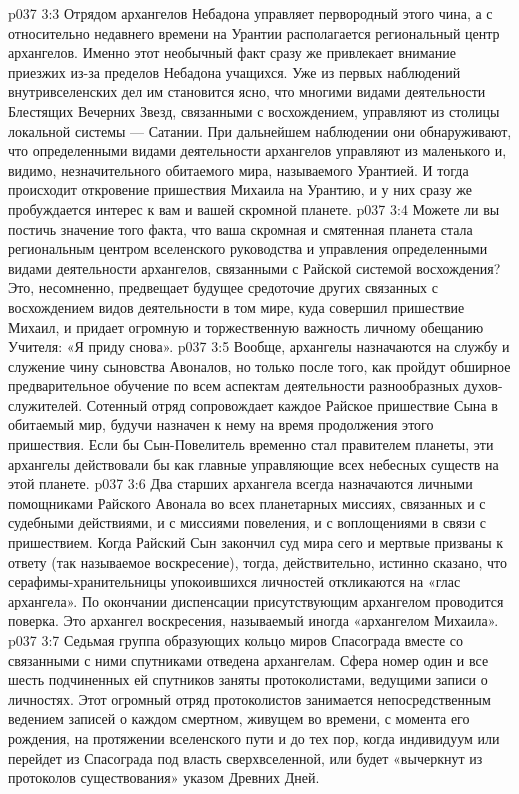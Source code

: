 \vs p037 3:3 \pc Отрядом архангелов Небадона управляет первородный этого чина, а с относительно недавнего времени на Урантии располагается региональный центр архангелов. Именно этот необычный факт сразу же привлекает внимание приезжих из\hyp{}за пределов Небадона учащихся. Уже из первых наблюдений внутривселенских дел им становится ясно, что многими видами деятельности Блестящих Вечерних Звезд, связанными с восхождением, управляют из столицы локальной системы --- Сатании. При дальнейшем наблюдении они обнаруживают, что определенными видами деятельности архангелов управляют из маленького и, видимо, незначительного обитаемого мира, называемого Урантией. И тогда происходит откровение пришествия Михаила на Урантию, и у них сразу же пробуждается интерес к вам и вашей скромной планете.
\vs p037 3:4 Можете ли вы постичь значение того факта, что ваша скромная и смятенная планета стала региональным центром вселенского руководства и управления определенными видами деятельности архангелов, связанными с Райской системой восхождения? Это, несомненно, предвещает будущее средоточие других связанных с восхождением видов деятельности в том мире, куда совершил пришествие Михаил, и придает огромную и торжественную важность личному обещанию Учителя: «Я приду снова».
\vs p037 3:5 \pc Вообще, архангелы назначаются на службу и служение чину сыновства Авоналов, но только после того, как пройдут обширное предварительное обучение по всем аспектам деятельности разнообразных духов\hyp{}служителей. Сотенный отряд сопровождает каждое Райское пришествие Сына в обитаемый мир, будучи назначен к нему на время продолжения этого пришествия. Если бы Сын\hyp{}Повелитель временно стал правителем планеты, эти архангелы действовали бы как главные управляющие всех небесных существ на этой планете.
\vs p037 3:6 Два старших архангела всегда назначаются личными помощниками Райского Авонала во всех планетарных миссиях, связанных и с судебными действиями, и с миссиями повеления, и с воплощениями в связи с пришествием. Когда Райский Сын закончил суд мира сего и мертвые призваны к ответу (так называемое воскресение), тогда, действительно, истинно сказано, что серафимы\hyp{}хранительницы упокоившихся личностей откликаются на «глас архангела». По окончании диспенсации присутствующим архангелом проводится поверка. Это архангел воскресения, называемый иногда «архангелом Михаила».
\vs p037 3:7 \pc {} Седьмая группа образующих кольцо миров Спасограда вместе со связанными с ними спутниками отведена архангелам. Сфера номер один и все шесть подчиненных ей спутников заняты протоколистами, ведущими записи о личностях. Этот огромный отряд протоколистов занимается непосредственным ведением записей о каждом смертном, живущем во времени, с момента его рождения, на протяжении вселенского пути и до тех пор, когда индивидуум или перейдет из Спасограда под власть сверхвселенной, или будет «вычеркнут из протоколов существования» указом Древних Дней.
